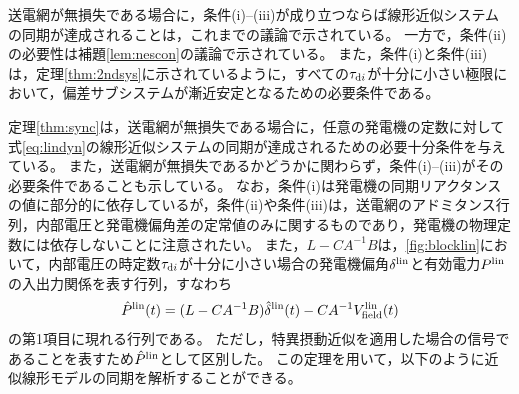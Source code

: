 \documentclass[tombow,dvipdfmx]{corona-a5}
\begin{document}
\begin{証明}
送電網が無損失である場合に，条件(i)--(iii)が成り立つならば線形近似システムの同期が達成されることは，これまでの議論で示されている。
一方で，条件(ii)の必要性は補題\ref{lem:nescon}の議論で示されている。
また，条件(i)と条件(iii)は，定理\ref{thm:2ndsys}に示されているように，すべての$\tau_{{\rm d}i}$が十分に小さい極限において，偏差サブシステムが漸近安定となるための必要条件である。
\end{証明}

定理\ref{thm:sync}は，送電網が無損失である場合に，任意の発電機の定数に対して式\ref{eq:lindyn}の線形近似システムの同期が達成されるための必要十分条件を与えている。
また，送電網が無損失であるかどうかに関わらず，条件(i)--(iii)がその必要条件であることも示している。
なお，条件(i)は発電機の同期リアクタンスの値に部分的に依存しているが，条件(ii)や条件(iii)は，送電網のアドミタンス行列，内部電圧と発電機偏角差の定常値のみに関するものであり，発電機の物理定数には依存しないことに注意されたい。
また，$L-CA^{-1}B$は，\ref{fig:blocklin}において，内部電圧の時定数$\tau_{{\rm d}i}$が十分に小さい場合の発電機偏角$\delta^{\rm lin}$と有効電力$P^{\rm lin}$の入出力関係を表す行列，すなわち
\begin{align*}
\hat{P}^{\rm lin}(t) = (L-CA^{-1}B) \hat{\delta}^{\rm lin}(t)
- C A^{-1} V^{\rm lin}_{\rm field}(t)
\end{align*}
の第1項目に現れる行列である。
ただし，特異摂動近似を適用した場合の信号であることを表すため$\hat{P}^{\rm lin}$として区別した。
この定理を用いて，以下のように近似線形モデルの同期を解析することができる。
\end{document}

